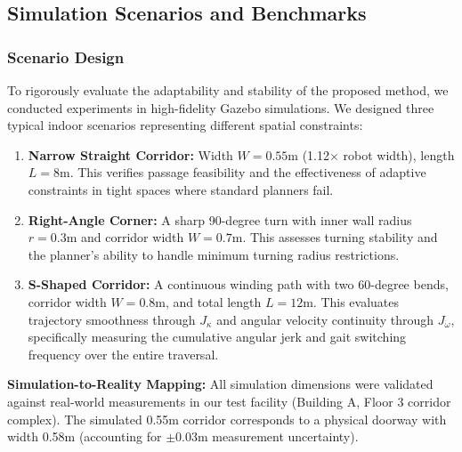 \documentclass[lettersize,journal]{IEEEtran}
\begin{document}
\subsection{Simulation Scenarios and Benchmarks}

\subsubsection{Scenario Design}
To rigorously evaluate the adaptability and stability of the proposed method, we conducted experiments in high-fidelity Gazebo simulations. We designed three typical indoor scenarios representing different spatial constraints:
\begin{enumerate}
\item \textbf{Narrow Straight Corridor:} Width $W = 0.55\text{m}$ (1.12$\times$ robot width), length $L = 8\text{m}$. This verifies passage feasibility and the effectiveness of adaptive constraints in tight spaces where standard planners fail.
\item \textbf{Right-Angle Corner:} A sharp 90-degree turn with inner wall radius $r = 0.3\text{m}$ and corridor width $W = 0.7\text{m}$. This assesses turning stability and the planner's ability to handle minimum turning radius restrictions.
\item \textbf{S-Shaped Corridor:} A continuous winding path with two 60-degree bends, corridor width $W = 0.8\text{m}$, and total length $L = 12\text{m}$. This evaluates trajectory smoothness through $J_{\kappa}$ and angular velocity continuity through $J_{\dot{\omega}}$, specifically measuring the cumulative angular jerk and gait switching frequency over the entire traversal.
\end{enumerate}

\textbf{Simulation-to-Reality Mapping:} All simulation dimensions were validated against real-world measurements in our test facility (Building A, Floor 3 corridor complex). The simulated 0.55m corridor corresponds to a physical doorway with width 0.58m (accounting for $\pm$0.03m measurement uncertainty).
\end{document}

